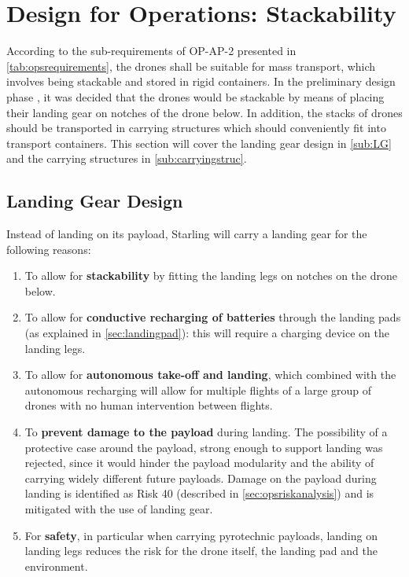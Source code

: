 \section{Design for Operations: Stackability} \label{sec:stackability}


According to the sub-requirements of OP-AP-2 presented in \autoref{tab:opsrequirements}, the drones shall be suitable for mass transport, which involves being stackable and stored in rigid containers. In the preliminary design phase \cite{midterm}, it was decided that the drones would be stackable by means of placing their landing gear on notches of the drone below. In addition, the stacks of drones should be transported in carrying structures which should conveniently fit into transport containers. This section will cover the landing gear design in \autoref{sub:LG} and the carrying structures in \autoref{sub:carryingstruc}.

\subsection{Landing Gear Design}
\label{sub:LG}

Instead of landing on its payload, Starling will carry a landing gear for the following reasons:


\begin{enumerate}
    \item To allow for \textbf{stackability} by fitting the landing legs on notches on the drone below.
    \item To allow for \textbf{conductive recharging of batteries} through the landing pads (as explained in \autoref{sec:landingpad}): this will require a charging device on the landing legs. 
    \item To allow for \textbf{autonomous take-off and landing}, which combined with the autonomous recharging will allow for multiple flights of a large group of drones with no human intervention between flights. 
    \item To \textbf{prevent damage to the payload} during landing. The possibility of a protective case around the payload, strong enough to support landing was rejected, since it would hinder the payload modularity and the ability of carrying widely different future payloads. Damage on the payload during landing is identified as Risk 40 (described in \autoref{sec:opsriskanalysis}) and is mitigated with the use of landing gear.
    \item For \textbf{safety}, in particular when carrying pyrotechnic payloads, landing on landing legs reduces the risk for the drone itself, the landing pad and the environment. 
\end{enumerate}

